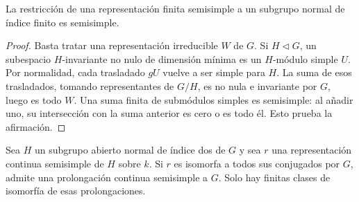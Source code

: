 \begin{lema}
\label{lem:gal-restriccion}
La restricción de una representación finita semisimple a un
subgrupo normal de índice finito es semisimple.
\end{lema}

\begin{proof}
Basta tratar una representación irreducible $W$ de $G$.
Si $H\triangleleft G$, un subespacio $H$-invariante no nulo de
dimensión mínima es un $H$-módulo simple $U$.
Por normalidad, cada trasladado $gU$ vuelve a ser simple para $H$.
La suma de esos trasladados, tomando representantes de $G/H$,
es no nula e invariante por $G$, luego es todo $W$.
Una suma finita de submódulos simples es semisimple:
al añadir uno, su intersección con la suma anterior es cero
o es todo él. Esto prueba la afirmación.
\end{proof}

\begin{lema}
\label{lem:gal-prolongacion}
Sea $H$ un subgrupo abierto normal de índice dos de $G$ y sea
$r$ una representación continua semisimple de $H$ sobre $k$.
Si $r$ es isomorfa a todos sus conjugados por $G$, admite una
prolongación continua semisimple a $G$.
Solo hay finitas clases de isomorfía de esas prolongaciones.
\end{lema}

